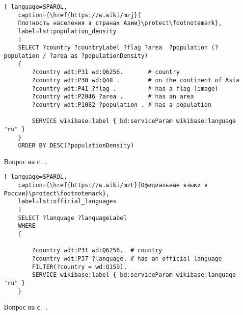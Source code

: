 \begin{task}
	
	
	\begin{lstlisting}[ language=SPARQL, 
	caption={\href{https://w.wiki/mzj}{
	Плотность населения в странах Азии}\protect\footnotemark},
	label=lst:population_density
	]
	SELECT ?country ?countryLabel ?flag ?area  ?population (?population / ?area as ?populationDensity)
	{
		?country wdt:P31 wd:Q6256.       # country
		?country wdt:P30 wd:Q48 .        # on the continent of Asia
		?country wdt:P41 ?flag .         # has a flag (image)
		?country wdt:P2046 ?area .       # has an area
		?country wdt:P1082 ?population . # has a population
		
		SERVICE wikibase:label { bd:serviceParam wikibase:language "ru" }
	}
	ORDER BY DESC(?populationDensity)
	\end{lstlisting}
	
	\small{Вопрос на с.~\pageref{lst:without_inception}.}
\end{task}

\begin{task}
	\label{answer:official_language}
	
	\begin{lstlisting}[ language=SPARQL, 
	caption={\href{https://w.wiki/mzF}{Официальные языки в России}\protect\footnotemark},
	label=lst:official_languages
	]
	SELECT ?lanquage ?lanquageLabel
	WHERE
	{
	
		?country wdt:P31 wd:Q6256.  # country
		?country wdt:P37 ?lanquage. # has an official language
		FILTER(?country = wd:Q159). 
		SERVICE wikibase:label { bd:serviceParam wikibase:language "ru" }
	}
	\end{lstlisting}
	
	\small{Вопрос на с.~\pageref{lst:without_inception}.}
\end{task}



